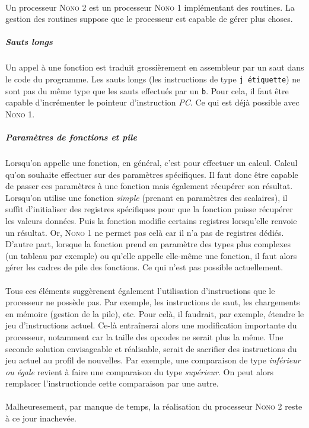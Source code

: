 \paragraph{}{
	Un processeur \textsc{Nono 2} est un processeur \textsc{Nono 1}
	implémentant des routines. La gestion des routines suppose que
	le processeur est capable de gérer plus choses.	
}

	\subparagraph{Sauts longs}{
	Un appel à une fonction est traduit grossièrement en assembleur par 
	un saut dans le code du programme.
	Les sauts longs (les instructions de type \verb|j étiquette|)
	ne sont pas du même type que les sauts effectués par un \verb|b|.
	Pour cela, il faut être capable d'incrémenter le pointeur d'instruction
	\textit{PC}. Ce qui est déjà possible avec \textsc{Nono 1}.
	}
	
	\subparagraph{Paramètres de fonctions et pile}{
	Lorsqu'on appelle une fonction, en général, c'est pour effectuer un calcul. 
	Calcul qu'on souhaite effectuer sur des paramètres spécifiques. Il faut donc
	être capable de passer ces paramètres à une fonction mais également récupérer
	son résultat. Lorsqu'on utilise une fonction 	\textit{simple} (prenant en 
	paramètres des scalaires), il suffit d'initialiser
	des registres spécifiques pour que la fonction puisse récupérer les valeurs
	données. Puis la fonction modifie certains registres lorsqu'elle renvoie un résultat.
	Or, \textsc{Nono 1} ne permet pas celà car il n'a pas de registres dédiés. \newline
	D'autre part, lorsque la fonction prend en paramètre des types plus complexes
	(un tableau par exemple) ou qu'elle appelle elle-même une fonction, il faut
	alors gérer les cadres de pile des fonctions. Ce qui n'est pas possible actuellement.
	}
	
\paragraph{}{
	Tous ces éléments suggèrenent également l'utilisation d'instructions que le processeur
	ne possède pas. Par exemple, les instructions de saut, les chargements en mémoire 
	(gestion de la pile), etc. Pour celà, il faudrait, par exemple, étendre le jeu
	d'instructions actuel. Ce-là entraînerai alors une modification importante du 
	processeur, notamment car la taille des opcodes ne serait plus la même. \newline
	Une seconde solution envisageable et réalisable, serait de sacrifier
	des instructions du jeu actuel au profil de nouvelles. Par exemple, une comparaison
	de type \textit{inférieur ou égale} revient à faire une comparaison du type
	\textit{supérieur}. On peut alors remplacer l'instructionde 
	cette comparaison par une autre.
}

\paragraph{}{
	Malheuresement, par manque de temps, la réalisation du processeur \textsc{Nono 2}
	reste à ce jour inachevée.
}